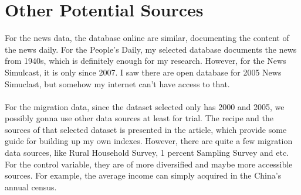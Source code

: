 \documentclass{article}
\begin{document}
\section{Other Potential Sources}
For the news data, the database online are similar, documenting the content of the news daily. For the People's Daily, my selected database documents the news from 1940s, which is definitely enough for my research. However, for the News Simulcast, it is only since 2007. I saw there are open database for 2005 News Simuclast, but somehow my internet can't have access to that.
\\~\\
For the migration data, since the dataset selected only has 2000 and 2005, we possibly gonna use other data sources at least for trial. The recipe and the sources of that selected dataset is presented in the article, which provide some guide for building up my own indexes. However, there are quite a few migration data sources, like Rural Household Survey, 1 percent Sampling Survey and etc. For the control variable, they are of more diversified and maybe more accessible  sources. For example, the average income can simply acquired in the China's annual census.

\linespread{1.6}
\printbibliography
\end{document}
